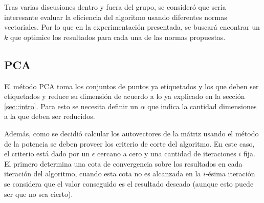 Tras varias discusiones dentro y fuera del grupo, se consideró que sería interesante evaluar la eficiencia del algoritmo usando diferentes normas vectoriales. Por lo que en la experimentación presentada, se buscará encontrar un $k$ que optimice los resultados para cada una de las normas propuestas.



\subsection{PCA}


El método PCA toma los conjuntos de puntos ya etiquetados y los que deben ser etiquetados y reduce su dimensión de acuerdo a lo ya explicado en la sección \ref{sec::intro}. Para esto se necesita definir un $\alpha$ que indica la cantidad dimensiones a la que deben ser reducidos.

Además, como se decidió calcular los autovectores de la mátriz usando el método de la potencia se deben proveer los criterio de corte del algoritmo. En este caso, el criterio está dado por un $\epsilon$ cercano a cero y una cantidad de iteraciones $i$ fija. El primero determina una cota de convergencia sobre los resultados en cada iteración del algoritmo, cuando esta cota no es alcanzada en la $i$-ésima iteración se considera que el valor conseguido es el resultado deseado (aunque esto puede ser que no sea cierto).

